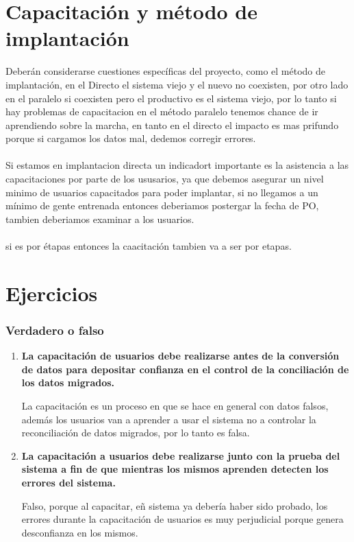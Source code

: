 \documentclass[12pt]{book}
\begin{document}
\section{Capacitación y método de implantación}
Deberán considerarse cuestiones específicas del proyecto, como el método de implantación, en el Directo el sistema viejo y el nuevo no coexisten, por otro lado en el paralelo si coexisten pero el productivo es el sistema viejo, por lo tanto si hay problemas de capacitacion en el método paralelo tenemos chance de ir aprendiendo sobre la marcha, en tanto en el directo el impacto es mas prifundo porque si cargamos los datos mal, dedemos corregir errores.\\ \\
Si estamos en implantacion directa un indicadort importante es la asistencia a las capacitaciones por parte de los ususarios, ya que debemos asegurar un nivel minimo de usuarios capacitados para poder implantar, si no llegamos a un mínimo de gente entrenada entonces deberiamos postergar la fecha de PO, tambien deberiamos examinar a los usuarios.
		 \\
		 \\
		 
si es por étapas entonces la caacitación tambien va a ser por etapas.
\section{Ejercicios}


\subsubsection{Verdadero o falso}
	\begin{enumerate}
		\item \textbf{La capacitación de usuarios debe realizarse antes de la conversión de datos para 							depositar confianza en el control de la conciliación de los datos migrados.} 
		
		La capacitación es un proceso en que se hace en general con datos falsos, además los usuarios van a aprender a usar el sistema no a controlar la reconciliación de datos migrados, por lo tanto es falsa.
				
		\item \textbf{La capacitación a usuarios debe realizarse junto con la prueba del sistema a fin de 						que mientras los mismos aprenden detecten los errores del sistema.}
		
		Falso, porque al capacitar, eñ sistema ya debería haber sido probado, los errores durante la capacitación de usuarios es muy perjudicial porque genera desconfianza en los mismos.
				
	\end{enumerate}
\end{document}
